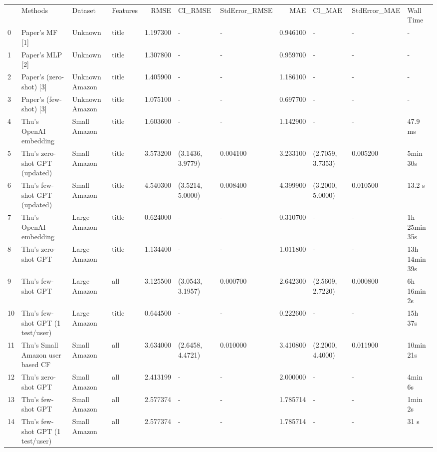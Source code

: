\begin{tabular}{llllrllrlll}
 & Methods & Dataset & Features & RMSE & CI_RMSE & StdError_RMSE & MAE & CI_MAE & StdError_MAE & Wall Time \\
0 & Paper's MF [1] & Unknown & title & 1.197300 & - & - & 0.946100 & - & - & - \\
1 & Paper's MLP [2] & Unknown & title & 1.307800 & - & - & 0.959700 & - & - & - \\
2 & Paper's (zero-shot) [3] & Unknown Amazon & title & 1.405900 & - & - & 1.186100 & - & - & - \\
3 & Paper's (few-shot) [3] & Unknown Amazon & title & 1.075100 & - & - & 0.697700 & - & - & - \\
4 & Thu's OpenAI embedding & Small Amazon & title & 1.603600 & - & - & 1.142900 & - & - & 47.9 ms \\
5 & Thu's zero-shot GPT (updated) & Small Amazon & title & 3.573200 & (3.1436, 3.9779) & 0.004100 & 3.233100 & (2.7059, 3.7353) & 0.005200 & 5min 30s \\
6 & Thu's few-shot GPT (updated) & Small Amazon & title & 4.540300 & (3.5214, 5.0000) & 0.008400 & 4.399900 & (3.2000, 5.0000) & 0.010500 & 13.2 s \\
7 & Thu's OpenAI embedding & Large Amazon & title & 0.624000 & - & - & 0.310700 & - & - & 1h 25min 35s \\
8 & Thu's zero-shot GPT & Large Amazon & title & 1.134400 & - & - & 1.011800 & - & - & 13h 14min 39s \\
9 & Thu's few-shot GPT & Large Amazon & all & 3.125500 & (3.0543, 3.1957) & 0.000700 & 2.642300 & (2.5609, 2.7220) & 0.000800 & 6h 16min 2s \\
10 & Thu's few-shot GPT (1 test/user) & Large Amazon & title & 0.644500 & - & - & 0.222600 & - & - & 15h 37s \\
11 & Thu's Small Amazon user based CF & Small Amazon & all & 3.634000 & (2.6458, 4.4721) & 0.010000 & 3.410800 & (2.2000, 4.4000) & 0.011900 & 10min 21s \\
12 & Thu's zero-shot GPT & Small Amazon & all & 2.413199 & - & - & 2.000000 & - & - & 4min 6s \\
13 & Thu's few-shot GPT & Small Amazon & all & 2.577374 & - & - & 1.785714 & - & - & 1min 2s \\
14 & Thu's few-shot GPT (1 test/user) & Small Amazon & all & 2.577374 & - & - & 1.785714 & - & - & 31 s \\
\end{tabular}
